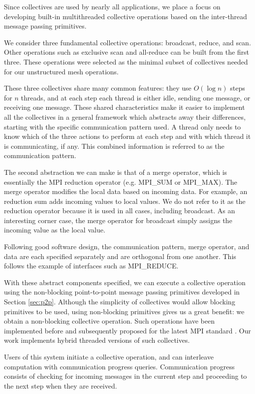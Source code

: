 \documentclass[final,1p,times]{elsarticle}
\begin{document}
Since collectives are used by nearly all applications,
we place a focus on developing built-in
multithreaded collective operations based on the
inter-thread message passing primitives.

We consider three fundamental collective operations:
broadcast, reduce, and scan.
Other operations such as exclusive scan and all-reduce
can be built from the first three.
These operations were selected as the minimal subset
of collectives needed for our unstructured mesh operations.

These three collectives share many common features:
they use $O(\log n)$ steps for $n$ threads,
and at each step each thread is either idle, sending one
message, or receiving one message.
These shared characteristics make it easier to implement
all the collectives in a general framework which abstracts
away their differences, starting with the specific communication
pattern used.
A thread only needs to know which of the three actions to perform at each
step and with which thread it is communicating, if any.
This combined information is referred to as the communication pattern.

The second abstraction we can make is that of a merge operator, which is
essentially the MPI reduction operator (e.g. MPI\_SUM or MPI\_MAX).
The merge operator modifies the local data based on incoming data.
For example, an reduction sum adds incoming values to local values.
We do not refer to it as the reduction operator because it is used
in all cases, including broadcast.
As an interesting corner case, the merge operator for broadcast simply
assigns the incoming value as the local value.

Following good software design, the communication pattern,
merge operator, and data are each specified separately
and are orthogonal from one another.
This follows the example of interfaces such as MPI\_REDUCE.

With these abstract components specified, we can execute a collective
operation
using the non-blocking point-to-point message passing primitives
developed in Section \ref{sec:p2p}.
Although the simplicity of collectives would allow blocking primitives
to be used, using non-blocking primitives gives us a great benefit:
we obtain a non-blocking collective operation.
Such operations have been implemented before \cite{hoefler2007implementation}
and subsequently proposed for the latest MPI standard \cite{hoefler2006non}.
Our work implements hybrid threaded versions of such collectives.

Users of this system initiate a collective operation, and can interleave
computation with communication progress queries.
Communication progress consists of checking for incoming messages in the current
step and proceeding to the next step when they are received.
\end{document}

